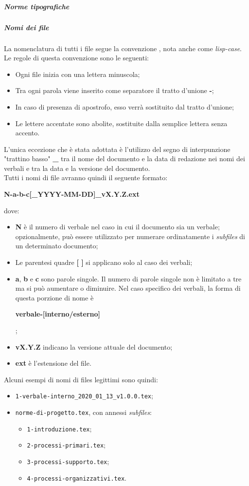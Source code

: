 \documentclass[../norme-di-progetto.tex]{subfiles}
\begin{document}
\subparagraph{Norme tipografiche}
\subparagraph*{Nomi dei file}
La nomenclatura di tutti i file segue la convenzione , nota anche come \textit{lisp-case}. Le regole di questa convenzione sono le seguenti:
\begin{itemize}
  \item Ogni file inizia con una lettera minuscola;
  \item Tra ogni parola viene inserito come separatore il tratto d'unione \textbf{-};
  \item In caso di presenza di apostrofo, esso verrà sostituito dal tratto d'unione;
  \item Le lettere accentate sono abolite, sostituite dalla semplice lettera senza accento.
\end{itemize}
L'unica eccezione che è stata adottata è l'utilizzo del segno di interpunzione "trattino basso" \textbf{\_} tra il nome del documento e la data di redazione nei nomi dei verbali e tra la data e la versione del documento. \\
Tutti i nomi di file avranno quindi il seguente formato: \\ \begin{center}
  \centering
  \textbf{N-a-b-c[\_YYYY-MM-DD]\_vX.Y.Z.ext}
\end{center} dove:
\begin{itemize}
  \item \textbf{N} è il numero di verbale nel caso in cui il documento sia un verbale; opzionalmente, può essere utilizzato per numerare ordinatamente i \textit{subfiles} di un determinato documento;
  \item Le parentesi quadre \textbf{[ ]} si applicano solo al caso dei verbali;
  \item \textbf{a}, \textbf{b} e \textbf{c} sono parole singole. Il numero di parole singole non è limitato a tre ma si può aumentare o diminuire. Nel caso specifico dei verbali, la forma di questa porzione di nome è \\ \begin{center}
    \centering
    \textbf{verbale-[interno/esterno]}
  \end{center};
  \item \textbf{vX.Y.Z} indicano la versione attuale del documento;
  \item \textbf{ext} è l'estensione del file.
\end{itemize}
Alcuni esempi di nomi di files legittimi sono quindi:
\begin{itemize}
  \item \texttt{1-verbale-interno\_2020\_01\_13\_v1.0.0.tex};
  \item \texttt{norme-di-progetto.tex}, con annessi \textit{subfiles}:
    \begin{itemize}
      \item \texttt{1-introduzione.tex};
      \item \texttt{2-processi-primari.tex};
      \item \texttt{3-processi-supporto.tex};
      \item \texttt{4-processi-organizzativi.tex}.
    \end{itemize}
\end{itemize}
\end{document}
